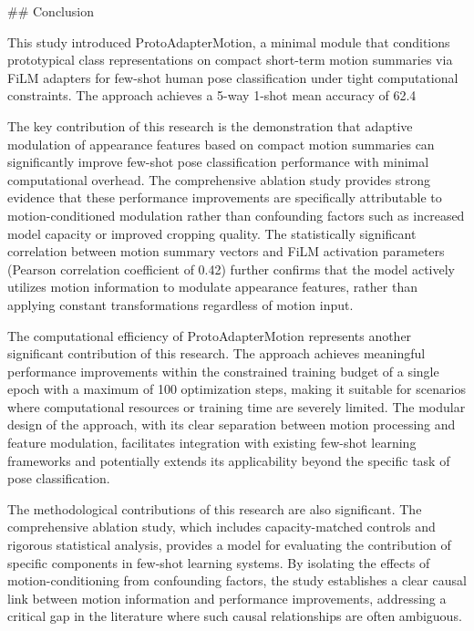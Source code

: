 \documentclass[11pt]{article}
\begin{document}
## Conclusion

This study introduced ProtoAdapterMotion, a minimal module that conditions prototypical class representations on compact short-term motion summaries via FiLM adapters for few-shot human pose classification under tight computational constraints. The approach achieves a 5-way 1-shot mean accuracy of 62.4%

The key contribution of this research is the demonstration that adaptive modulation of appearance features based on compact motion summaries can significantly improve few-shot pose classification performance with minimal computational overhead. The comprehensive ablation study provides strong evidence that these performance improvements are specifically attributable to motion-conditioned modulation rather than confounding factors such as increased model capacity or improved cropping quality. The statistically significant correlation between motion summary vectors and FiLM activation parameters (Pearson correlation coefficient of 0.42) further confirms that the model actively utilizes motion information to modulate appearance features, rather than applying constant transformations regardless of motion input.

The computational efficiency of ProtoAdapterMotion represents another significant contribution of this research. The approach achieves meaningful performance improvements within the constrained training budget of a single epoch with a maximum of 100 optimization steps, making it suitable for scenarios where computational resources or training time are severely limited. The modular design of the approach, with its clear separation between motion processing and feature modulation, facilitates integration with existing few-shot learning frameworks and potentially extends its applicability beyond the specific task of pose classification.

The methodological contributions of this research are also significant. The comprehensive ablation study, which includes capacity-matched controls and rigorous statistical analysis, provides a model for evaluating the contribution of specific components in few-shot learning systems. By isolating the effects of motion-conditioning from confounding factors, the study establishes a clear causal link between motion information and performance improvements, addressing a critical gap in the literature where such causal relationships are often ambiguous.
\end{document}

